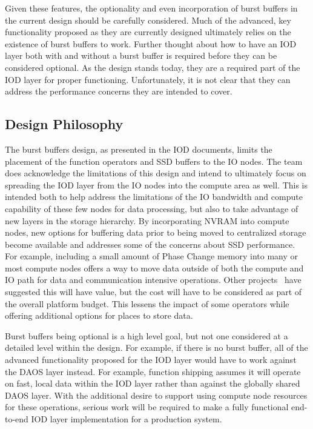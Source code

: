 \documentclass[conference]{IEEEtran}
\begin{document}
Given these features, the optionality and even incorporation of burst buffers
in the current design should be carefully considered. Much of the advanced, key
functionality proposed as they are currently designed ultimately relies on the
existence of burst buffers to work. Further thought about how to have an IOD
layer both with and without a burst buffer is required before they can be
considered optional. As the design stands today, they are a required part of
the IOD layer for proper functioning. Unfortunately, it is not clear that they
can address the performance concerns they are intended to cover.

\subsection{Design Philosophy}
The burst buffers design, as presented in the IOD documents, limits the
placement of the function operators and SSD buffers to the IO nodes. The team
does acknowledge the limitations of this design and intend to ultimately focus
on spreading the IOD layer from the IO nodes into the compute area as well.
This is intended both to help address the limitations of the IO bandwidth and
compute capability of these few nodes for data processing, but also to take
advantage of new layers in the storage hierarchy. By incorporating NVRAM into
compute nodes, new options for buffering data prior to being moved to
centralized storage become available and addresses some of the concerns about
SSD performance. For example, including a small amount of Phase Change memory
into many or most compute nodes offers a way to move data outside of both the
compute and IO path for data and communication intensive operations. Other 
projects~\cite{zheng:2010:predata} have suggested this will have value, but the
cost will have to be considered as part of the overall platform budget. This
lessens the impact of some operators while offering additional options for
places to store data.

Burst buffers being optional is a high level goal, but not one considered at a
detailed level within the design. For example, if there is no burst buffer, all
of the advanced functionality proposed for the IOD layer would have to work
against the DAOS layer instead. For example, function shipping assumes it will
operate on fast, local data within the IOD layer rather than against the
globally shared DAOS layer. With the additional desire to support using compute
node resources for these operations, serious work will be required to make a
fully functional end-to-end IOD layer implementation for a production system.
\end{document}

